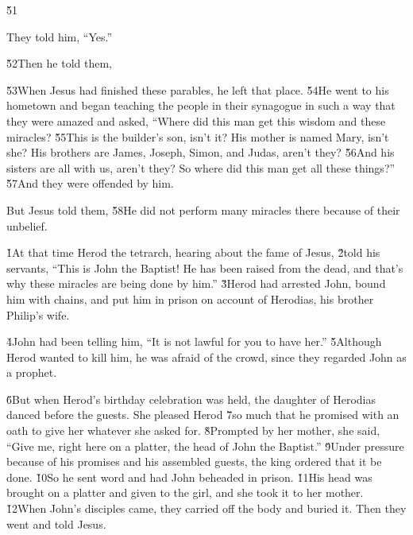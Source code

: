 \v{51}

They told him, ``Yes.''

\v{52}Then he told them, 

\v{53}When Jesus had finished these parables, he left that place. \v{54}He went to his hometown and began teaching the people in their synagogue in such a way that they were amazed and asked, ``Where did this man get this wisdom and these miracles? \v{55}This is the builder's son, isn't it? His mother is named Mary, isn't she? His brothers are James, Joseph, Simon, and Judas, aren't they? \v{56}And his sisters are all with us, aren't they? So where did this man get all these things?'' \v{57}And they were offended by him.

But Jesus told them,  \v{58}He did not perform many miracles there because of their unbelief.

\v{1}At that time Herod the tetrarch, hearing about the fame of Jesus, \v{2}told his servants, ``This is John the Baptist! He has been raised from the dead, and that's why these miracles are being done by him.'' \v{3}Herod had arrested John, bound him with chains, and put him in prison on account of Herodias, his brother Philip's wife.

\v{4}John had been telling him, ``It is not lawful for you to have her.'' \v{5}Although Herod wanted to kill him, he was afraid of the crowd, since they regarded John as a prophet.

\v{6}But when Herod's birthday celebration was held, the daughter of Herodias danced before the guests. She pleased Herod \v{7}so much that he promised with an oath to give her whatever she asked for. \v{8}Prompted by her mother, she said, ``Give me, right here on a platter, the head of John the Baptist.'' \v{9}Under pressure because of his promises and his assembled guests, the king ordered that it be done. \v{10}So he sent word and had John beheaded in prison. \v{11}His head was brought on a platter and given to the girl, and she took it to her mother. \v{12}When John's disciples came, they carried off the body and buried it. Then they went and told Jesus.

